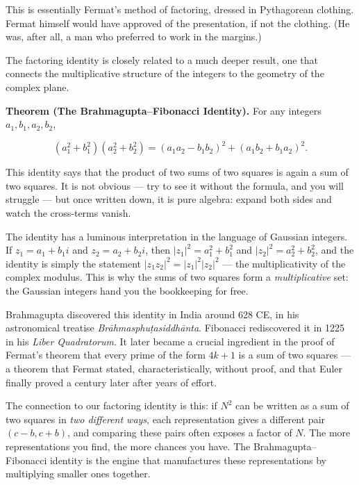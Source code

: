 \documentclass[11pt,twoside,openright]{book}
\theoremstyle{definition}
\theoremstyle{remark}
\begin{document}
This is essentially Fermat's method of factoring, dressed in Pythagorean clothing. Fermat himself would have approved of the presentation, if not the clothing. (He was, after all, a man who preferred to work in the margins.)

The factoring identity is closely related to a much deeper result, one that connects the multiplicative structure of the integers to the geometry of the complex plane.

\textbf{Theorem (The Brahmagupta--Fibonacci Identity).} For any integers $a_1, b_1, a_2, b_2$,

\[(a_1^2 + b_1^2)(a_2^2 + b_2^2) = (a_1 a_2 - b_1 b_2)^2 + (a_1 b_2 + b_1 a_2)^2.\]

This identity says that the product of two sums of two squares is again a sum of two squares. It is not obvious --- try to see it without the formula, and you will struggle --- but once written down, it is pure algebra: expand both sides and watch the cross-terms vanish.

The identity has a luminous interpretation in the language of Gaussian integers. If $z_1 = a_1 + b_1 i$ and $z_2 = a_2 + b_2 i$, then $|z_1|^2 = a_1^2 + b_1^2$ and $|z_2|^2 = a_2^2 + b_2^2$, and the identity is simply the statement $|z_1 z_2|^2 = |z_1|^2 |z_2|^2$ --- the multiplicativity of the complex modulus. This is why the sums of two squares form a \textit{multiplicative} set: the Gaussian integers hand you the bookkeeping for free.

Brahmagupta discovered this identity in India around 628 CE, in his astronomical treatise \textit{Brāhmasphuṭasiddhānta}. Fibonacci rediscovered it in 1225 in his \textit{Liber Quadratorum}. It later became a crucial ingredient in the proof of Fermat's theorem that every prime of the form $4k + 1$ is a sum of two squares --- a theorem that Fermat stated, characteristically, without proof, and that Euler finally proved a century later after years of effort.

The connection to our factoring identity is this: if $N^2$ can be written as a sum of two squares in \textit{two different ways}, each representation gives a different pair $(c - b, c + b)$, and comparing these pairs often exposes a factor of $N$. The more representations you find, the more chances you have. The Brahmagupta--Fibonacci identity is the engine that manufactures these representations by multiplying smaller ones together.
\end{document}
